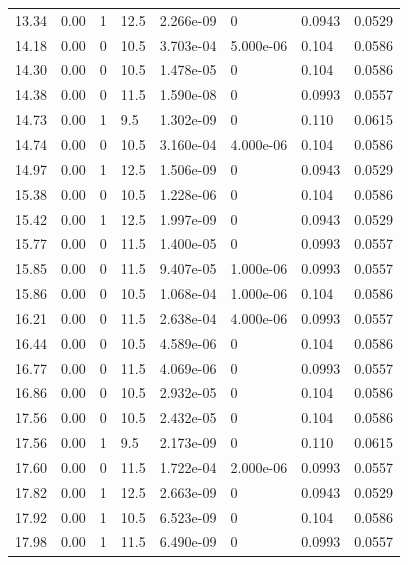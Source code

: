 \documentclass[preview]{standalone}
\begin{document}
{{{\begin{tabular}{L{1.2cm}C{1.2cm} C{0.3cm}C{0.5cm} C{1.4cm}C{1.4cm} C{1.4cm}C{1.4cm}}
  13.34  &  0.00  & 1     & 12.5 &  2.266e-09  & 0  & 0.0943 &  0.0529   \\ 
  14.18  &  0.00  & 0     & 10.5 &  3.703e-04  & 5.000e-06  & 0.104 &  0.0586   \\ 
  14.30  &  0.00  & 0     & 10.5 &  1.478e-05  & 0  & 0.104 &  0.0586   \\ 
  14.38  &  0.00  & 0     & 11.5 &  1.590e-08  & 0  & 0.0993 &  0.0557   \\ 
  14.73  &  0.00  & 1     & 9.5 &  1.302e-09  & 0  & 0.110 &  0.0615   \\ 
  14.74  &  0.00  & 0     & 10.5 &  3.160e-04  & 4.000e-06  & 0.104 &  0.0586   \\ 
  14.97  &  0.00  & 1     & 12.5 &  1.506e-09  & 0  & 0.0943 &  0.0529   \\ 
  15.38  &  0.00  & 0     & 10.5 &  1.228e-06  & 0  & 0.104 &  0.0586   \\ 
  15.42  &  0.00  & 1     & 12.5 &  1.997e-09  & 0  & 0.0943 &  0.0529   \\ 
  15.77  &  0.00  & 0     & 11.5 &  1.400e-05  & 0  & 0.0993 &  0.0557   \\ 
  15.85  &  0.00  & 0     & 11.5 &  9.407e-05  & 1.000e-06  & 0.0993 &  0.0557   \\ 
  15.86  &  0.00  & 0     & 10.5 &  1.068e-04  & 1.000e-06  & 0.104 &  0.0586   \\ 
  16.21  &  0.00  & 0     & 11.5 &  2.638e-04  & 4.000e-06  & 0.0993 &  0.0557   \\ 
  16.44  &  0.00  & 0     & 10.5 &  4.589e-06  & 0  & 0.104 &  0.0586   \\ 
  16.77  &  0.00  & 0     & 11.5 &  4.069e-06  & 0  & 0.0993 &  0.0557   \\ 
  16.86  &  0.00  & 0     & 10.5 &  2.932e-05  & 0  & 0.104 &  0.0586   \\ 
  17.56  &  0.00  & 0     & 10.5 &  2.432e-05  & 0  & 0.104 &  0.0586   \\ 
  17.56  &  0.00  & 1     & 9.5 &  2.173e-09  & 0  & 0.110 &  0.0615   \\ 
  17.60  &  0.00  & 0     & 11.5 &  1.722e-04  & 2.000e-06  & 0.0993 &  0.0557   \\ 
  17.82  &  0.00  & 1     & 12.5 &  2.663e-09  & 0  & 0.0943 &  0.0529   \\ 
  17.92  &  0.00  & 1     & 10.5 &  6.523e-09  & 0  & 0.104 &  0.0586   \\ 
  17.98  &  0.00  & 1     & 11.5 &  6.490e-09  & 0  & 0.0993 &  0.0557   \\ 

\end{tabular}}}}
\end{document}
